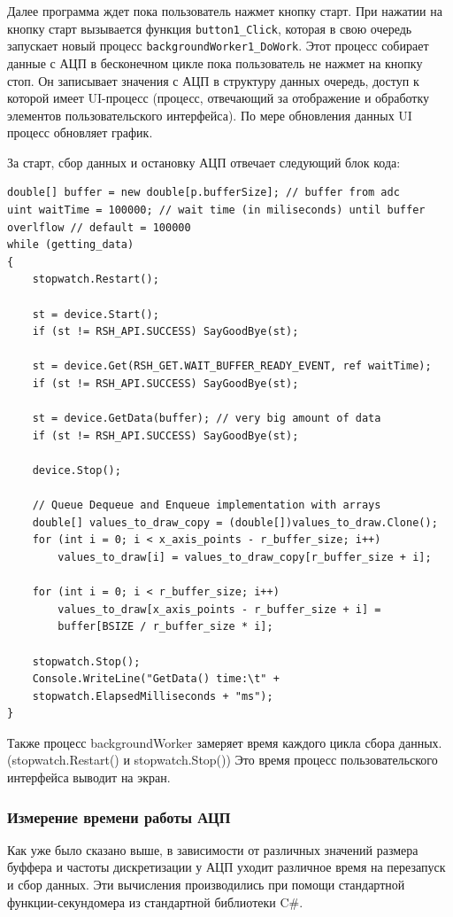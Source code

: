 \documentclass[../paper.tex]{subfiles}
\begin{document}
Далее программа ждет пока пользователь нажмет кнопку старт. При нажатии на кнопку старт вызывается функция \lstinline|button1_Click|, которая в свою очередь запускает новый процесс \lstinline|backgroundWorker1_DoWork|. Этот процесс собирает данные с АЦП в бесконечном цикле пока пользователь не нажмет на кнопку стоп. Он записывает значения с АЦП в структуру данных очередь, доступ к которой имеет UI-процесс (процесс, отвечающий за отображение и обработку элементов пользовательского интерфейса). По мере обновления данных UI процесс обновляет график.

За старт, сбор данных и остановку АЦП отвечает следующий блок кода: 

\begin{lstlisting}
double[] buffer = new double[p.bufferSize]; // buffer from adc
uint waitTime = 100000; // wait time (in miliseconds) until buffer overlflow // default = 100000
while (getting_data)
{
    stopwatch.Restart();

    st = device.Start();
    if (st != RSH_API.SUCCESS) SayGoodBye(st);

    st = device.Get(RSH_GET.WAIT_BUFFER_READY_EVENT, ref waitTime);
    if (st != RSH_API.SUCCESS) SayGoodBye(st);

    st = device.GetData(buffer); // very big amount of data
    if (st != RSH_API.SUCCESS) SayGoodBye(st);

    device.Stop();

    // Queue Dequeue and Enqueue implementation with arrays
    double[] values_to_draw_copy = (double[])values_to_draw.Clone();
    for (int i = 0; i < x_axis_points - r_buffer_size; i++) 
        values_to_draw[i] = values_to_draw_copy[r_buffer_size + i];

    for (int i = 0; i < r_buffer_size; i++)
        values_to_draw[x_axis_points - r_buffer_size + i] = 
        buffer[BSIZE / r_buffer_size * i];

    stopwatch.Stop();
    Console.WriteLine("GetData() time:\t" + 
    stopwatch.ElapsedMilliseconds + "ms");
} 
\end{lstlisting}

Также процесс backgroundWorker замеряет время каждого цикла сбора данных. (stopwatch.Restart() и stopwatch.Stop()) Это время процесс пользовательского интерфейса выводит на экран.

\subsubsection{Измерение времени работы АЦП}
Как уже было сказано выше, в зависимости от различных значений размера буффера и частоты дискретизации у АЦП уходит различное время на перезапуск и сбор данных. Эти вычисления производились при помощи стандартной функции-секундомера из стандартной библиотеки C\#.
\end{document}
